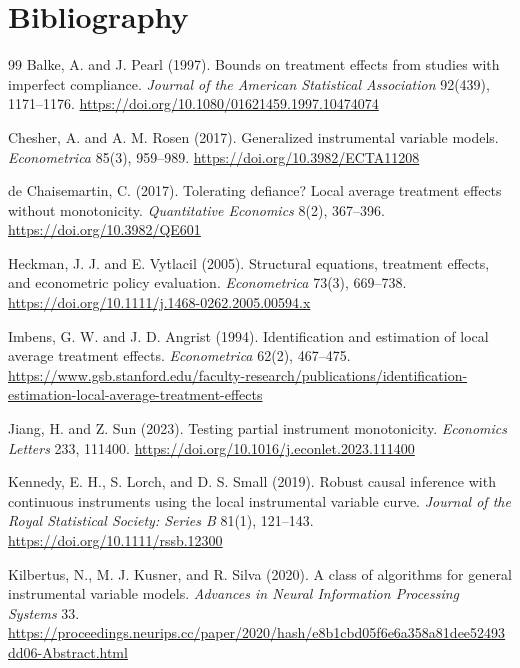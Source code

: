 \documentclass[11pt]{article}
\theoremstyle{definition}
\theoremstyle{plain}
\theoremstyle{remark}
\begin{document}
\section*{Bibliography}
\begin{thebibliography}{99}
Balke, A. and J. Pearl (1997).
Bounds on treatment effects from studies with imperfect compliance.
\emph{Journal of the American Statistical Association} 92(439), 1171--1176.
\url{https://doi.org/10.1080/01621459.1997.10474074}

Chesher, A. and A. M. Rosen (2017).
Generalized instrumental variable models.
\emph{Econometrica} 85(3), 959--989.
\url{https://doi.org/10.3982/ECTA11208}

de Chaisemartin, C. (2017).
Tolerating defiance? Local average treatment effects without monotonicity.
\emph{Quantitative Economics} 8(2), 367--396.
\url{https://doi.org/10.3982/QE601}

Heckman, J. J. and E. Vytlacil (2005).
Structural equations, treatment effects, and econometric policy evaluation.
\emph{Econometrica} 73(3), 669--738.
\url{https://doi.org/10.1111/j.1468-0262.2005.00594.x}

Imbens, G. W. and J. D. Angrist (1994).
Identification and estimation of local average treatment effects.
\emph{Econometrica} 62(2), 467--475.
\url{https://www.gsb.stanford.edu/faculty-research/publications/identification-estimation-local-average-treatment-effects}

Jiang, H. and Z. Sun (2023).
Testing partial instrument monotonicity.
\emph{Economics Letters} 233, 111400.
\url{https://doi.org/10.1016/j.econlet.2023.111400}

Kennedy, E. H., S. Lorch, and D. S. Small (2019).
Robust causal inference with continuous instruments using the local instrumental variable curve.
\emph{Journal of the Royal Statistical Society: Series B} 81(1), 121--143.
\url{https://doi.org/10.1111/rssb.12300}

Kilbertus, N., M. J. Kusner, and R. Silva (2020).
A class of algorithms for general instrumental variable models.
\emph{Advances in Neural Information Processing Systems} 33.
\url{https://proceedings.neurips.cc/paper/2020/hash/e8b1cbd05f6e6a358a81dee52493dd06-Abstract.html}


\end{thebibliography}
\end{document}
